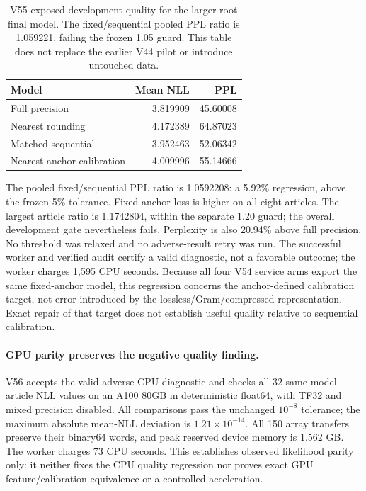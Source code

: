 \documentclass[10pt,twocolumn,letterpaper]{article}
\begin{document}
\begin{table}[t]
\centering
\small
\begin{tabular}{lrr}
\toprule
Model & Mean NLL & PPL \\
\midrule
Full precision & 3.819909 & 45.60008 \\
Nearest rounding & 4.172389 & 64.87023 \\
Matched sequential & 3.952463 & 52.06342 \\
Nearest-anchor calibration & 4.009996 & 55.14666 \\
\bottomrule
\end{tabular}
\caption{V55 exposed development quality for the larger-root final model.
The fixed/sequential pooled PPL ratio is 1.059221, failing the frozen 1.05 guard.
This table does not replace the earlier V44 pilot or introduce untouched data.}
\label{tab:v55}
\end{table}

The pooled fixed/sequential PPL ratio is 1.0592208: a 5.92\% regression, above
the frozen 5\% tolerance. Fixed-anchor loss is higher on all eight articles.
The largest article ratio is 1.1742804, within the separate 1.20 guard; the
overall development gate nevertheless fails. Perplexity is also 20.94\%
above full precision. No threshold was relaxed and no adverse-result retry
was run. The successful worker and verified audit certify a valid diagnostic,
not a favorable outcome; the worker charges 1,595 CPU seconds.
Because all four V54 service arms export the same fixed-anchor model, this
regression concerns the anchor-defined calibration target, not error introduced
by the lossless/Gram/compressed representation. Exact repair of that target
does not establish useful quality relative to sequential calibration.

\paragraph{GPU parity preserves the negative quality finding.}
V56 accepts the valid adverse CPU diagnostic and checks all 32 same-model
article NLL values on an A100 80GB in deterministic float64, with TF32 and
mixed precision disabled. All comparisons pass the unchanged $10^{-8}$
tolerance; the maximum absolute mean-NLL deviation is $1.21\times10^{-14}$.
All 150 array transfers preserve their binary64 words, and peak reserved device
memory is 1.562 GB. The worker charges 73 CPU seconds. This establishes observed
likelihood parity only: it neither fixes the CPU quality regression nor proves
exact GPU feature/calibration equivalence or a controlled acceleration.
\end{document}
